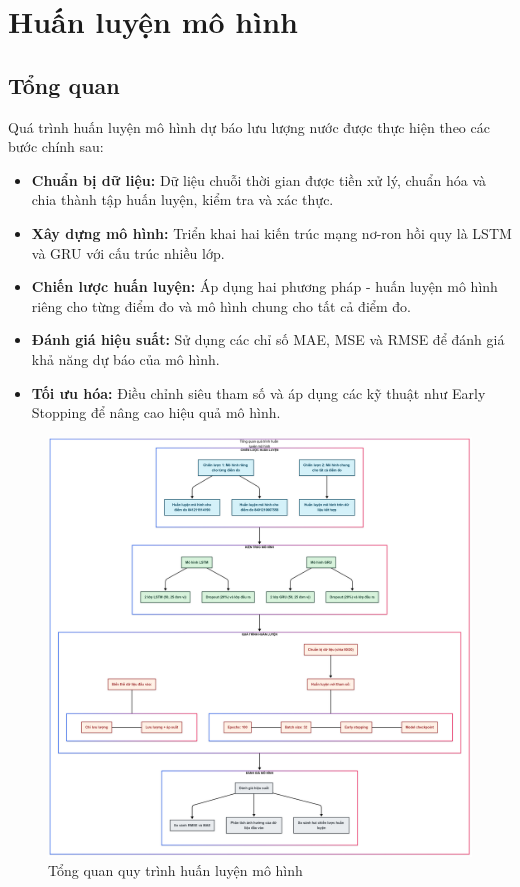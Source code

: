 \section{Huấn luyện mô hình}
\subsection{Tổng quan}
Quá trình huấn luyện mô hình dự báo lưu lượng nước được thực hiện theo các bước chính sau:
\begin{itemize}
    \item \textbf{Chuẩn bị dữ liệu:} Dữ liệu chuỗi thời gian được tiền xử lý, chuẩn hóa và chia thành tập huấn luyện, kiểm tra và xác thực.
    \item \textbf{Xây dựng mô hình:} Triển khai hai kiến trúc mạng nơ-ron hồi quy là LSTM và GRU với cấu trúc nhiều lớp.
    \item \textbf{Chiến lược huấn luyện:} Áp dụng hai phương pháp - huấn luyện mô hình riêng cho từng điểm đo và mô hình chung cho tất cả điểm đo.
    \item \textbf{Đánh giá hiệu suất:} Sử dụng các chỉ số MAE, MSE và RMSE để đánh giá khả năng dự báo của mô hình.
    \item \textbf{Tối ưu hóa:} Điều chỉnh siêu tham số và áp dụng các kỹ thuật như Early Stopping để nâng cao hiệu quả mô hình.
\end{itemize}

\begin{figure}[htbp]
    \centering
    \includegraphics[width=\textwidth]{image/section6_1/luoc_do_tong_quan_huan_luyen_mo_hinh.png}
    \caption{Tổng quan quy trình huấn luyện mô hình}
    \label{fig:luoc_do_tong_quan_huan_luyen_mo_hinh}
\end{figure}
